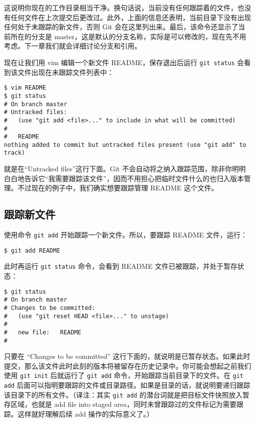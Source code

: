 \documentclass[a4paper]{book}
\begin{document}
这说明你现在的工作目录相当干净。换句话说，当前没有任何跟踪着的文件，也没有任何文件在上次提交后更改过。此外，上面的信息还表明，当前目录下没有出现任何处于未跟踪的新文件，否则 Git 会在这里列出来。最后，该命令还显示了当前所在的分支是 master，这是默认的分支名称，实际是可以修改的，现在先不用考虑。下一章我们就会详细讨论分支和引用。

现在让我们用 vim 编辑一个新文件 README，保存退出后运行 \texttt{git status} 会看到该文件出现在未跟踪文件列表中：

\begin{shaded}\begin{verbatim}
$ vim README
$ git status
# On branch master
# Untracked files:
#   (use "git add <file>..." to include in what will be committed)
#
#	README
nothing added to commit but untracked files present (use "git add" to track)
\end{verbatim}\end{shaded}

就是在“Untracked files”这行下面。Git 不会自动将之纳入跟踪范围，除非你明明白白地告诉它“我需要跟踪该文件”，因而不用担心把临时文件什么的也归入版本管理。不过现在的例子中，我们确实想要跟踪管理 README 这个文件。

\subsection{跟踪新文件}

使用命令 \texttt{git add} 开始跟踪一个新文件。所以，要跟踪 README 文件，运行：

\begin{shaded}\begin{verbatim}
$ git add README
\end{verbatim}\end{shaded}

此时再运行 \texttt{git status} 命令，会看到 README 文件已被跟踪，并处于暂存状态：

\begin{shaded}\begin{verbatim}
$ git status
# On branch master
# Changes to be committed:
#   (use "git reset HEAD <file>..." to unstage)
#
#	new file:   README
#
\end{verbatim}\end{shaded}

只要在 “Changes to be committed” 这行下面的，就说明是已暂存状态。如果此时提交，那么该文件此时此刻的版本将被留存在历史记录中。你可能会想起之前我们使用 \texttt{git init} 后就运行了 \texttt{git add} 命令，开始跟踪当前目录下的文件。在 \texttt{git add} 后面可以指明要跟踪的文件或目录路径。如果是目录的话，就说明要递归跟踪该目录下的所有文件。（译注：其实 \texttt{git add} 的潜台词就是把目标文件快照放入暂存区域，也就是 add file into staged area，同时未曾跟踪过的文件标记为需要跟踪。这样就好理解后续 add 操作的实际意义了。）
\end{document}
